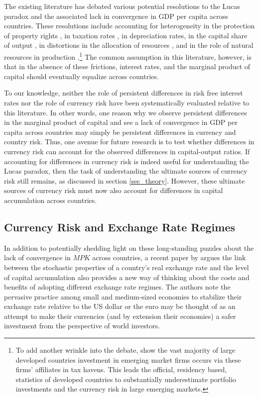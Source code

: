 \documentclass[11pt]{article}
\begin{document}
The existing literature has debated various potential resolutions to the Lucas paradox and the associated lack in convergence in GDP per capita across countries. These resolutions include accounting for heterogeneity in the protection of property rights \citep{HallJones1997}, in taxation rates \citep{Jorgenson1996}, in depreciation rates, in the capital share of output \citep{Neiman2014}, in distortions in the allocation of resources \citep{HsiehKlenow2009}, and in the role of natural resources in production \citep{CaselliFeyrer2007, Monge-Naranjoetal2019}.\footnote{To add another wrinkle into the debate, \citet{CMNS2020} show the vast majority of large developed countries investment in emerging market firms occurs via these firms' affiliates in tax havens. This leads the official, residency based, statistics of developed countries to substantially underestimate portfolio investments and the currency risk in large emerging markets.} The common assumption in this literature, however, is that in the absence of these frictions, interest rates, and the marginal product of capital should eventually equalize across countries.

To our knowledge, neither the role of persistent differences in risk free interest rates nor the role of currency risk have been systematically evaluated relative to this literature. In other words, one reason why we observe persistent differences in the marginal product of capital and see a lack of convergence in GDP per capita across countries may simply be persistent differences in currency and country risk. Thus, one avenue for future research is to test whether differences in currency risk can account for the observed differences in capital-output ratios. If accounting for differences in currency risk is indeed useful for understanding the Lucas paradox, then the task of understanding the ultimate sources of currency risk still remains, as discussed in section \ref{sec_theory}. However, these ultimate sources of currency risk must now also account for differences in capital accumulation across countries. 

\subsection{Currency Risk and Exchange Rate Regimes\label{sec_regimes}}

In addition to potentially shedding light on these long-standing puzzles about the lack of convergence in $MPK$ across countries, a recent paper by \citet{HassanMertensZhang2020} argues the link between the stochastic properties of a country's real exchange rate and the level of capital accumulation also provides a new way of thinking about the costs and benefits of adopting different exchange rate regimes. The authors note the pervasive practice among small and medium-sized economies to stabilize their exchange rate relative to the US dollar or the euro \citep{ilzetzki2018exchange} may be thought of as an attempt to make their currencies (and by extension their economies) a safer investment from the perspective of world investors. 
\end{document}
